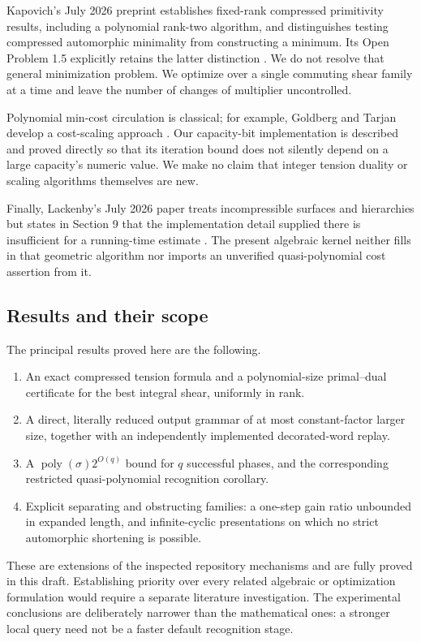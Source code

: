 \documentclass[11pt,letterpaper]{article}
\theoremstyle{definition}
\theoremstyle{remark}\newtheorem{remark}[theorem]{Remark}
\newcommand{\poly}{\operatorname{poly}}
\begin{document}
Kapovich's July 2026 preprint establishes fixed-rank compressed primitivity
results, including a polynomial rank-two algorithm, and distinguishes testing
compressed automorphic minimality from constructing a minimum. Its Open
Problem 1.5 explicitly retains the latter distinction \cite{kapovich}.
We do not resolve that general minimization problem. We optimize over a
single commuting shear family at a time and leave the number of changes of
multiplier uncontrolled.

Polynomial min-cost circulation is classical; for example, Goldberg and
Tarjan develop a cost-scaling approach \cite{goldberg}. Our capacity-bit
implementation is described and proved directly so that its iteration bound
does not silently depend on a large capacity's numeric value. We make no
claim that integer tension duality or scaling algorithms themselves are new.

Finally, Lackenby's July 2026 paper treats incompressible surfaces and
hierarchies but states in Section 9 that the implementation detail supplied
there is insufficient for a running-time estimate \cite{lackenby}. The
present algebraic kernel neither fills in that geometric algorithm nor
imports an unverified quasi-polynomial cost assertion from it.

\subsection{Results and their scope}

The principal results proved here are the following.
\begin{enumerate}[label=(\roman*)]
\item An exact compressed tension formula and a polynomial-size primal--dual
certificate for the best integral shear, uniformly in rank.
\item A direct, literally reduced output grammar of at most constant-factor
larger size, together with an independently implemented decorated-word replay.
\item A $\poly(\sigma)2^{O(q)}$ bound for $q$ successful phases, and the
corresponding restricted quasi-polynomial recognition corollary.
\item Explicit separating and obstructing families: a one-step gain ratio
unbounded in expanded length, and infinite-cyclic presentations on which no
strict automorphic shortening is possible.
\end{enumerate}

These are extensions of the inspected repository mechanisms and are fully
proved in this draft. Establishing priority over every related algebraic or
optimization formulation would require a separate literature investigation.
The experimental conclusions are deliberately narrower than the mathematical
ones: a stronger local query need not be a faster default recognition stage.
\end{document}
